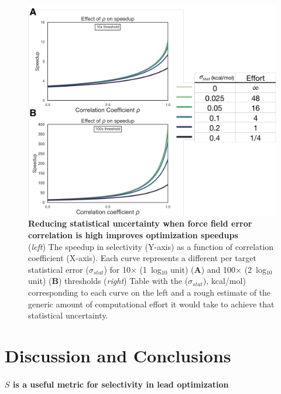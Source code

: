 \documentclass[phd,tocprelim]{cornell}
\begin{document}
\begin{landscape}
\begin{figure}
\centering
\includegraphics[width=0.6\linewidth]{figures/figure6.pdf}
\caption[Reducing statistical uncertainty when force field error correlation is high improves optimization speedups]{
{\bf Reducing statistical uncertainty when force field error correlation is high improves optimization speedups} \\
(\emph{left}) The speedup in selectivity (Y-axis) as a function of correlation coefficient (X-axis). Each curve represents a different per target statistical error ($\sigma_{stat}$) for 10$\times$ (1~log$_{10}$ unit) ({\bf A}) and 100$\times$ (2~log$_{10}$ unit) ({\bf B}) thresholds (\emph{right}) Table with the ($\sigma_{stat}$), kcal/mol) corresponding to each curve on the left and a rough estimate of the generic amount of computational effort it would take to achieve that statistical uncertainty. 
\label{fig:figure-6}
}
\end{figure}
\end{landscape}


\section{Discussion and Conclusions}
\paragraph{$S$ is a useful metric for selectivity in lead optimization} \mbox{}\\
\end{document}
